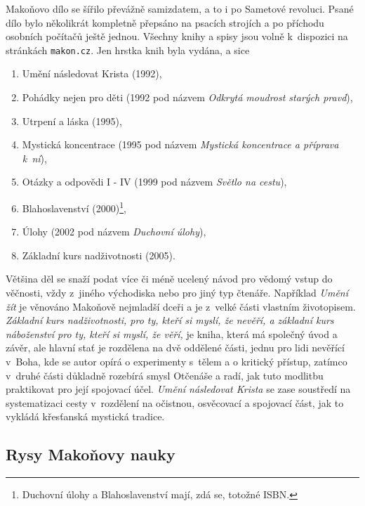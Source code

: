 Makoňovo dílo se šířilo převážně samizdatem, a to i po
Sametové revoluci. Psané dílo bylo několikrát kompletně přepsáno na
psacích strojích a po příchodu osobních počítačů ještě jednou. Všechny knihy a
spisy jsou volně k~dispozici na stránkách \texttt{makon.cz}. Jen hrstka knih
byla vydána, a sice
\begin{enumerate}
\item{Umění následovat Krista (1992)\cite{makon1995umeni},}
\item{
    Pohádky nejen pro děti (1992 pod názvem {\em Odkrytá moudrost starých
    pravd})\cite{makon1992odkryta},
}
\item{Utrpení a láska (1995)\cite{makon1995utrpeni},}
\item{
    Mystická koncentrace (1995 pod názvem
    {\em Mystická koncentrace a příprava k~ní})\cite{makon1995mysticka},
}
\item{
    Otázky a odpovědi I - IV (1999 pod názvem {\em Světlo na cestu})\cite{makon1999svetlo},
}
\item{
    Blahoslavenství
    (2000)\cite{makon2000blahoslavenstvi}\footnote{\label{note1}
        Duchovní úlohy a Blahoslavenství mají, zdá se, totožné ISBN.
    },
}
\item{
    Úlohy (2002 pod názvem {\em Duchovní
    úlohy})\cite{makon2002ulohy},
}
\item{Základní kurs nadživotnosti (2005)\cite{makon2005zakladni}.}
\end{enumerate}

Většina děl se snaží podat více či méně ucelený návod pro vědomý vstup do
věčnosti, vždy z~jiného východiska nebo pro jiný typ čtenáře. Například {\em Umění
žít} je věnováno Makoňově nejmladší dceři a je z~velké části vlastním
životopisem. {\em Základní kurs nadživotnosti, pro ty, kteří si myslí, že nevěří, a
základní kurs náboženství pro ty, kteří si myslí, že věří,} je kniha, která má
společný úvod a závěr, ale hlavní stať je rozdělena na dvě oddělené části, jednu
pro lidi nevěřící v~Boha, kde se autor opírá o experimenty s~tělem a o kritický
přístup, zatímco v~druhé části důkladně rozebírá smysl Otčenáše a radí,
jak tuto modlitbu praktikovat pro její spojovací účel. {\em Umění následovat
Krista} se zase soustředí na systematizaci cesty v~rozdělení na očistnou,
osvěcovací a spojovací část, jak to vykládá křesťanská mystická tradice.

\subsection{Rysy Makoňovy nauky}

